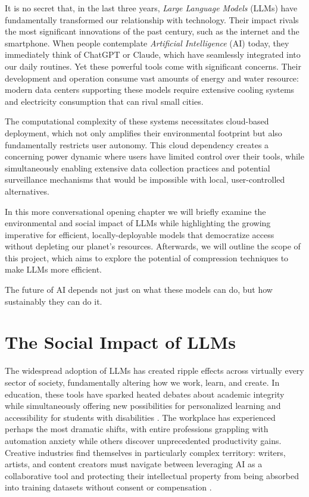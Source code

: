 
It is no secret that, in the last three years, \textit{Large Language Models} (LLMs) have fundamentally transformed our relationship with technology.
Their impact rivals the most significant innovations of the past century, such as the internet and the smartphone. When people contemplate \textit{Artificial Intelligence} (AI) today, they immediately think of ChatGPT or Claude, which have seamlessly integrated into our daily routines.
Yet these powerful tools come with significant concerns. Their development and operation consume vast amounts of energy and water resource: modern data centers supporting these models require extensive cooling systems and electricity consumption that can rival small cities.

The computational complexity of these systems necessitates cloud-based deployment, which not only amplifies their environmental footprint but also fundamentally restricts user autonomy. This cloud dependency creates a concerning power dynamic where users have limited control over their tools, while simultaneously enabling extensive data collection practices and potential surveillance mechanisms that would be impossible with local, user-controlled alternatives.

In this more conversational opening chapter we will briefly examine the environmental and social impact of LLMs while highlighting the growing imperative for efficient, locally-deployable models that democratize access without depleting our planet's resources. Afterwards, we will outline the scope of this project, which aims to explore the potential of compression techniques to make LLMs more efficient.

The future of AI depends not just on what these models can do, but how sustainably they can do it.

\section{The Social Impact of LLMs}
The widespread adoption of LLMs has created ripple effects across virtually every sector of society, fundamentally altering how we work, learn, and create. In education, these tools have sparked heated debates about academic integrity while simultaneously offering new possibilities for personalized learning and accessibility for students with disabilities \cite{academic_integrity}. The workplace has experienced perhaps the most dramatic shifts, with entire professions grappling with automation anxiety while others discover unprecedented productivity gains. Creative industries find themselves in particularly complex territory: writers, artists, and content creators must navigate between leveraging AI as a collaborative tool and protecting their intellectual property from being absorbed into training datasets without consent or compensation \cite{artistic_integrity}.

